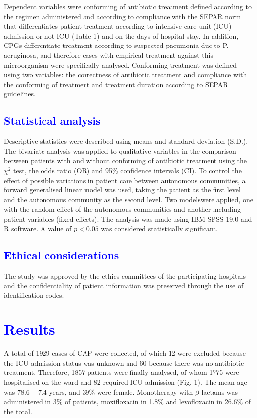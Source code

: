 \documentclass[11pt, a4paper]{article}
\begin{document}
\begin{multicols}{2}
Dependent variables were conforming of antibiotic treatment defined according to the regimen administered and according to compliance with the SEPAR \cite{menendez2010neumonia} norm that differentiates patient treatment according to intensive care unit (ICU) admission or not ICU (Table 1) and on the days of hospital stay. In addition, CPGs differentiate treatment according to suspected pneumonia due to P. aeruginosa, and therefore cases with empirical treatment against this microorganism were specifically analysed. Conforming treatment was defined using two variables: the correctness of antibiotic treatment and compliance with the conforming of treatment and treatment duration according to SEPAR guidelines.

\subsection*{\textcolor{blue}{Statistical analysis}}
Descriptive statistics were described using means and standard deviation (S.D.). The bivariate analysis was applied to qualitative variables in the comparison between patients with and without conforming of antibiotic treatment using the $\chi^{2}$ test, the odds ratio (OR) and 95\% confidence intervals (CI). To control the effect of possible variations in patient care between autonomous communities, a forward generalised linear model was used, taking the patient as the first level and the autonomous community as the second level. Two modelswere applied, one with the random effect of the autonomous communities and another including patient variables (fixed effects). The analysis was made using IBM SPSS 19.0 and R
software. A value of $p< 0.05$ was considered statistically significant.

\subsection*{\textcolor{blue}{Ethical considerations}}
The study was approved by the ethics committees of the participating hospitals and the confidentiality of patient information was preserved through the use of identification codes.

\section*{\textcolor{blue}{Results}}
A total of 1929 cases of CAP were collected, of which 12 were excluded because the ICU admission status was unknown and 60 because there was no antibiotic treatment. Therefore, 1857 patients were finally analysed, of whom 1775 were hospitalised on the ward and 82 required ICU admission (Fig. 1). The mean age was $78.6 \pm 7.4$ years, and 39\% were female. Monotherapy with $\beta$-lactams was administered in 3\% of patients, moxifloxacin in 1.8\% and levofloxacin in 26.6\% of the total.


\end{multicols}
\end{document}
